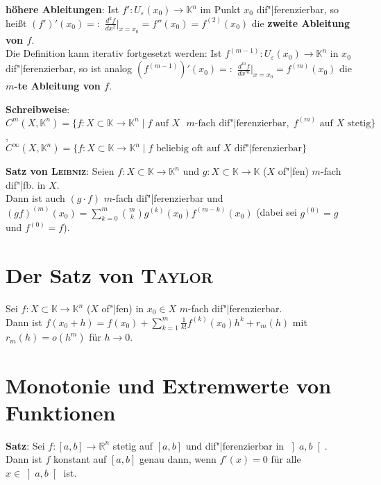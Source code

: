 \textbf{höhere Ableitungen}:
Ist $f': U_\varepsilon(x_0) \rightarrow \mathbb{K}^n$ im Punkt $x_0$
dif"|ferenzierbar, so heißt
$(f')'(x_0) =:$ {\large $\frac{d^2 f}{dx^2}$}$\big|_{x=x_0} = f''(x_0) =
f^{(2)}(x_0)$ die \textbf{zweite Ableitung von $f$}. \\
Die Definition kann iterativ fortgesetzt werden:
Ist $f^{(m-1)}: U_\varepsilon(x_0) \rightarrow \mathbb{K}^n$ in $x_0$
dif"|ferenzierbar, so ist analog
$(f^{(m-1)})'(x_0) =:$ {\large $\frac{d^m f}{dx^m}$}$\big|_{x=x_0} =
f^{(m)}(x_0)$ die \textbf{$m$-te Ableitung von $f$}.

\textbf{Schreibweise}: \\
$C^m(X, \mathbb{K}^n) = \{f: X \subset \mathbb{K} \rightarrow \mathbb{K}^n
\;|\; f \text{ auf } X \text{ } m \text{-fach dif"|ferenzierbar},\;
f^{(m)} \text{ auf } X \text{ stetig}\}$, \\
$C^\infty(X, \mathbb{K}^n) = \{f: X \subset \mathbb{K} \rightarrow \mathbb{K}^n
\;|\; f \text{ beliebig oft auf } X \text{ dif"|ferenzierbar}\}$

\textbf{Satz von \textsc{Leibniz}}:
Seien $f: X \subset \mathbb{K} \rightarrow \mathbb{K}^n$ und
$g: X \subset \mathbb{K} \rightarrow \mathbb{K}$ ($X$ of"|fen)
$m$-fach dif"|fb. in $X$. \\
Dann ist auch $(g \cdot f)$ $m$-fach dif"|ferenzierbar und
$(gf)^{(m)}(x_0) = \sum_{k=0}^m \binom{m}{k} g^{(k)}(x_0) f^{(m-k)}(x_0)$
(dabei sei $g^{(0)} = g$ und $f^{(0)} = f$).

\section{%
    Der Satz von \textsc{Taylor}%
}

Sei $f: X \subset \mathbb{K} \rightarrow \mathbb{K}^n$ ($X$ of"|fen)
in $x_0 \in X$ $m$-fach dif"|ferenzierbar. \\
Dann ist $f(x_0 + h) = f(x_0) + \sum_{k=1}^m \frac{1}{k!} f^{(k)}(x_0) h^k +
r_m(h)$ mit $r_m(h) = o(h^m)$ für $h \to 0$.

\section{%
    Monotonie und Extremwerte von Funktionen%
}

\textbf{Satz}:
Sei $f: [a,b] \rightarrow \mathbb{R}^n$ stetig auf $[a,b]$ und dif"|ferenzierbar
in $\left]a,b\right[$. \\
Dann ist $f$ konstant auf $[a,b]$ genau dann, wenn $f'(x) = 0$ für alle
$x \in \left]a,b\right[$ ist.

